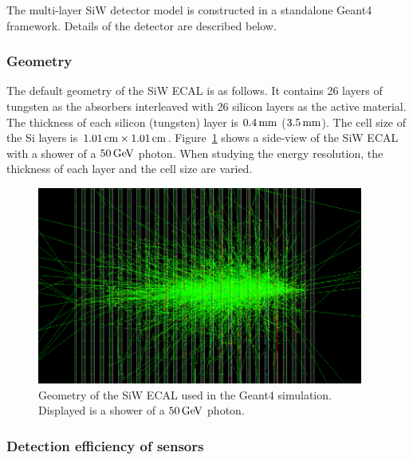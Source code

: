 The multi-layer SiW detector model is constructed in a standalone Geant4 framework. Details of the detector are described below.

\subsubsection{Geometry}
The default geometry of the SiW ECAL is as follows. It contains 26 layers of tungsten as the absorbers interleaved with 26 silicon layers as the active material.
The thickness of each silicon (tungsten) layer is $0.4\text{\,mm}$ ($3.5\text{\,mm}$).
The cell size of the Si layers is $1.01\text{\,cm}\times1.01\text{\,cm}$.
Figure~\ref{fig:geometrySiW} shows a side-view of the SiW ECAL with a shower of a $50\text{\,Ge\kern -0.1em V}$ photon.
When studying the energy resolution, the thickness of each layer and the cell size are varied.
\begin{figure}[hb]
  \begin{center}
    \includegraphics[width=0.6\linewidth]{Figures/06_ECAL/plotsZW/geometrySiW.pdf}%
    \vspace*{-0.5cm}
  \end{center}
  \caption{
   Geometry of the SiW ECAL used in the Geant4 simulation. Displayed is a shower of a $50\text{\,Ge\kern -0.1em V}$ photon.
  }
  \label{fig:geometrySiW}
\end{figure}


\subsubsection{Detection efficiency of sensors}


